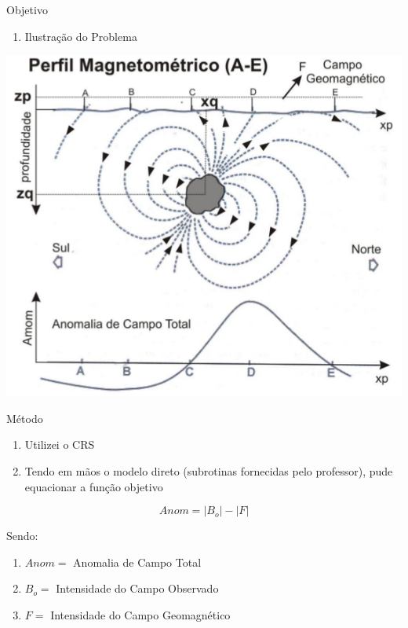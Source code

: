 \documentclass{beamer}
\begin{document}
\begin{frame}{Objetivo}
\begin{enumerate}
\item Ilustração do Problema
\end{enumerate}
\begin{center}
\includegraphics[scale=0.4]{problema}
\end{center}
\end{frame}

\begin{frame}{Método}
\begin{enumerate}
\item Utilizei o CRS
\item Tendo em mãos o modelo direto (subrotinas fornecidas pelo professor), pude equacionar a função objetivo 
\end{enumerate}

\begin{equation}
Anom = |B_{o}| - |F|
\end{equation}

Sendo:
\begin{enumerate}
\item $Anom =$ Anomalia de Campo Total
\item $B_{o} =$ Intensidade do Campo Observado
\item $F =$ Intensidade do Campo Geomagnético
\end{enumerate}

\end{frame}
\end{document}
